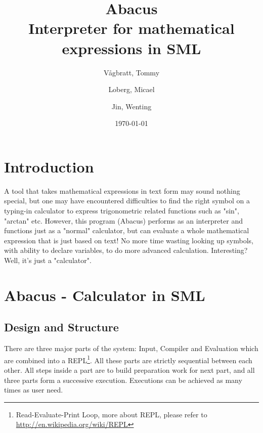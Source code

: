 \documentclass[12pt,a4paper]{article}
\title {Abacus \\ Interpreter for mathematical expressions in SML}
\author{
  Vågbratt, Tommy
  \and
  Loberg, Micael
	\and
  Jin, Wenting}
\date{\today}
\begin{document}
\tableofcontents
\newpage


\section{Introduction}
\textnormal{A tool that takes mathematical expressions in text form may sound nothing special, but one may have encountered difficulties to find the right symbol on a typing-in calculator to express trigonometric related functions such as "sin", "arctan" etc. However, this program (Abacus) performs as an interpreter and functions just as a "normal" calculator, but can evaluate a whole mathematical expression that is just based on text! No more time wasting looking up symbols, with ability to declare variables, to do more advanced calculation. Interesting? Well, it's just a "calculator".}

\section{Abacus - Calculator in SML}
\subsection{Design and Structure}
\textnormal{There are three major parts of the system: Input, Compiler and Evaluation which are combined into a REPL\footnote{Read-Evaluate-Print Loop, more about REPL, please refer to \url{http://en.wikipedia.org/wiki/REPL}}. All these parts are strictly sequential between each other. All steps inside a part are to build preparation work for next part, and all three parts form a successive execution. Executions can be achieved as many times as user need.}
\end{document}
